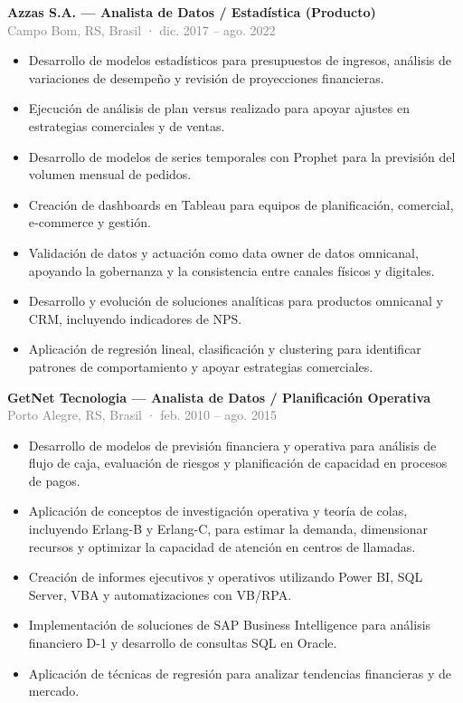 \documentclass[10pt,a4paper]{article}
\newcommand{\role}[3]{%
  \Needspace{13\baselineskip}%
  \textbf{#1}\\[-1pt]
  {\small\textcolor{grey}{#2}}\\[-1pt]
  #3\par}
\begin{document}
\role{Azzas S.A. — Analista de Datos / Estadística (Producto)}{Campo Bom, RS, Brasil · dic. 2017 – ago. 2022}{
\begin{itemize}
  \item Desarrollo de modelos estadísticos para presupuestos de ingresos, análisis de variaciones de desempeño y revisión de proyecciones financieras.
  \item Ejecución de análisis de plan versus realizado para apoyar ajustes en estrategias comerciales y de ventas.
  \item Desarrollo de modelos de series temporales con Prophet para la previsión del volumen mensual de pedidos.
  \item Creación de dashboards en Tableau para equipos de planificación, comercial, e-commerce y gestión.
  \item Validación de datos y actuación como data owner de datos omnicanal, apoyando la gobernanza y la consistencia entre canales físicos y digitales.
  \item Desarrollo y evolución de soluciones analíticas para productos omnicanal y CRM, incluyendo indicadores de NPS.
  \item Aplicación de regresión lineal, clasificación y clustering para identificar patrones de comportamiento y apoyar estrategias comerciales.
\end{itemize}}

\role{GetNet Tecnologia — Analista de Datos / Planificación Operativa}{Porto Alegre, RS, Brasil · feb. 2010 – ago. 2015}{
\begin{itemize}
  \item Desarrollo de modelos de previsión financiera y operativa para análisis de flujo de caja, evaluación de riesgos y planificación de capacidad en procesos de pagos.
  \item Aplicación de conceptos de investigación operativa y teoría de colas, incluyendo Erlang-B y Erlang-C, para estimar la demanda, dimensionar recursos y optimizar la capacidad de atención en centros de llamadas.
  \item Creación de informes ejecutivos y operativos utilizando Power BI, SQL Server, VBA y automatizaciones con VB/RPA.
  \item Implementación de soluciones de SAP Business Intelligence para análisis financiero D-1 y desarrollo de consultas SQL en Oracle.
  \item Aplicación de técnicas de regresión para analizar tendencias financieras y de mercado.
\end{itemize}}
\end{document}
